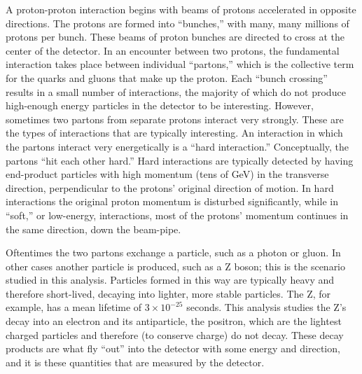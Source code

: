 A proton-proton interaction begins 
with beams of protons accelerated 
in opposite directions.  
The protons are formed into ``bunches,'' 
with many, many millions of protons per bunch.  
These beams of proton bunches are directed to 
cross at the center of the detector.  
In an encounter between two protons, 
the fundamental interaction takes place 
between individual ``partons,'' 
which is the collective term for 
the quarks and gluons that make up the proton.  
Each ``bunch crossing'' results in 
a small number of interactions, 
the majority of which do not 
produce high-enough energy particles in the detector %
to be interesting.  
However, sometimes two partons %
from separate protons interact very strongly.  
These are the types of interactions 
that are typically interesting.  
An interaction in which the partons interact 
very energetically is a ``hard interaction.''  
Conceptually, the partons ``hit each other hard.''  
Hard interactions are typically detected 
by having end-product particles with 
high momentum (tens of GeV)  
in the transverse direction, 
perpendicular to the protons' original 
direction of motion.  
In hard interactions %
the original 
proton momentum 
is
disturbed significantly, while %
in ``soft,'' or low-energy, interactions, 
most of the protons' momentum 
continues in the same direction, 
down the beam-pipe.  

Oftentimes the two partons exchange 
a particle, such as a photon or gluon.  
In other cases another particle is produced, %
such as a Z boson; 
this is the scenario 
studied in this analysis.  
Particles formed in this way 
are typically heavy and therefore 
short-lived, 
decaying into lighter, more stable particles.  
The Z, for example, has a mean lifetime 
of $3 \times 10^{-25}$ seconds.  
This analysis studies the Z's decay into 
an electron and its antiparticle, the positron, 
which are the lightest charged particles 
and therefore (to conserve charge) 
do not decay.  
These decay products are what fly ``out'' 
into the detector with 
some energy and direction, 
and it is these quantities 
that are measured by the detector.  

